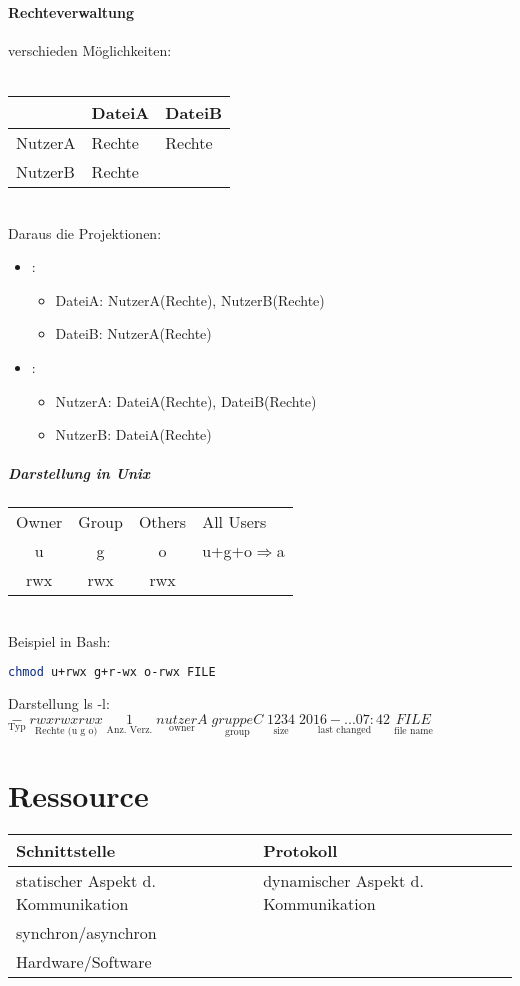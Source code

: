 \paragraph{Rechteverwaltung} verschieden Möglichkeiten:\\
\\
\begin{tabular}{l | l l }
& DateiA & DateiB\\
\hline
NutzerA & Rechte & Rechte\\
NutzerB & Rechte & 
\end{tabular}\\
Daraus die Projektionen:
\begin{itemize}
\item {}:
\begin{itemize}
\item DateiA: NutzerA(Rechte), NutzerB(Rechte)
\item DateiB: NutzerA(Rechte)
\end{itemize}
\item {}:
\begin{itemize}
\item NutzerA: DateiA(Rechte), DateiB(Rechte)
\item NutzerB: DateiA(Rechte)
\end{itemize}
\end{itemize}
\subparagraph{Darstellung in Unix} \parskp
\begin{tabular}{c | c | c l}
Owner & Group & Others & \quad All Users\\
u & g & o & \quad u+g+o$\Rightarrow$a\\
rwx & rwx & rwx
\end{tabular}\\
Beispiel in Bash:
\begin{lstlisting}[language=bash]
chmod u+rwx g+r-wx o-rwx FILE
\end{lstlisting}
Darstellung ls -l:\\
$\underset{\text{Typ}}{-}\;\underset{\text{Rechte (u g o)}}{rwxrwxrwx}\;\underset{\text{Anz. Verz.}}{1}\;\underset{\text{owner}}{nutzerA}\;\underset{\text{group}}{gruppeC}\;\underset{\text{size}}{1234}\;\underset{\text{last changed}}{2016-...07:42}\; \underset{\text{file name}}{FILE}$

\section{Ressource}
\begin{tabular}{l | l}
Schnittstelle & Protokoll\\
\hline
statischer Aspekt d. Kommunikation & dynamischer Aspekt d. Kommunikation\\
synchron/asynchron\\
Hardware/Software
\end{tabular}
